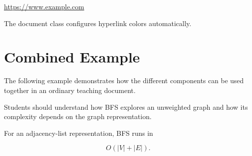 \documentclass{csdept}
\begin{document}
\url{https://www.example.com}

The document class configures hyperlink colors automatically.

\section{Combined Example}

The following example demonstrates how the different components
can be used together in an ordinary teaching document.

\begin{objective}

Students should understand how BFS explores an unweighted graph
and how its complexity depends on the graph representation.

\end{objective}

\begin{important}

For an adjacency-list representation, BFS runs in

\[
    O(|V|+|E|).
\]

\end{important}
\end{document}
